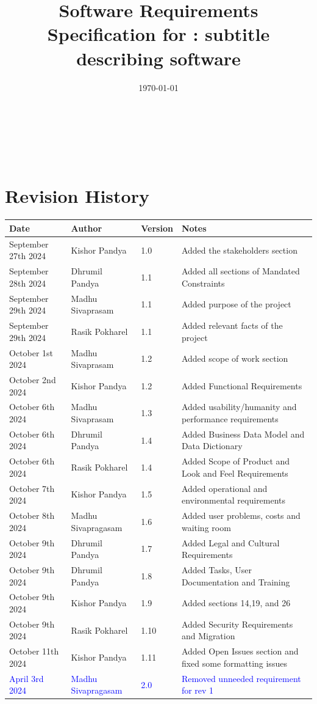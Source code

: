 \documentclass[12pt]{article}
\begin{document}
\title{Software Requirements Specification for \progname: subtitle describing software} 
\author{\authname}
\date{\today}
	
\maketitle

~\newpage


\tableofcontents

~\newpage

\section*{Revision History}

\begin{tabularx}{\textwidth}{p{4cm}p{3cm}p{1cm}X}
\toprule {\textbf{Date}} & {\textbf{Author}} & {\textbf{Version}} & {\textbf{Notes}}\\
\midrule
September 27th 2024 & Kishor Pandya & 1.0 & Added the stakeholders section\\
September 28th 2024 & Dhrumil Pandya & 1.1 & Added all sections of Mandated Constraints\\
September 29th 2024 & Madhu Sivaprasam & 1.1 & Added purpose of the project\\
September 29th 2024 & Rasik Pokharel & 1.1 & Added relevant facts of the project\\
October 1st 2024 & Madhu Sivaprasam & 1.2 & Added scope of work section\\
October 2nd 2024 & Kishor Pandya & 1.2 & Added Functional Requirements\\
October 6th 2024 & Madhu Sivaprasam & 1.3 & Added usability/humanity and performance requirements\\
October 6th 2024 & Dhrumil Pandya & 1.4 & Added Business Data Model and Data Dictionary\\
October 6th 2024 & Rasik Pokharel & 1.4 & Added Scope of Product and Look and Feel Requirements\\
October 7th 2024 & Kishor Pandya & 1.5 & Added operational and environmental requirements\\
October 8th 2024 & Madhu Sivapragasam & 1.6 & Added user problems, costs and waiting room\\
October 9th 2024 & Dhrumil Pandya & 1.7 & Added Legal and Cultural Requirements\\
October 9th 2024 & Dhrumil Pandya & 1.8 & Added Tasks, User Documentation and Training \\
October 9th 2024 & Kishor Pandya & 1.9 & Added sections 14,19, and 26\\
October 9th 2024 & Rasik Pokharel & 1.10 & Added Security Requirements and Migration \\
October 11th 2024 & Kishor Pandya & 1.11 & Added Open Issues section and fixed some formatting issues \\
\textcolor{blue}{April 3rd 2024} & \textcolor{blue}{Madhu Sivapragasam} & \textcolor{blue}{2.0} & \textcolor{blue}{Removed unneeded requirement for rev 1}\\
\bottomrule
\end{tabularx}
\end{document}
